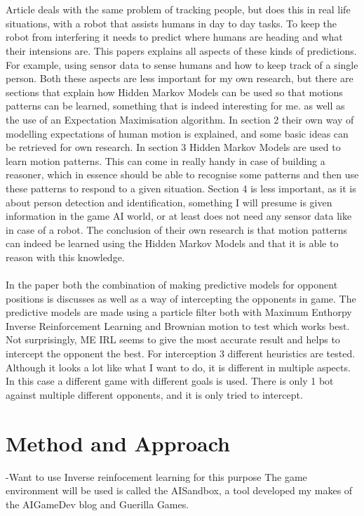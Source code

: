 \documentclass[a4paper, 12pt]{article}
\begin{document}
\\\\
Article \citep{Bennewitz05learningmotion} deals with the same problem of tracking people, but does this in real life situations, with a robot that assists humans in day to day tasks. To keep the robot from interfering it needs to predict where humans are heading and what their intensions are. This papers explains all aspects of these kinds of predictions. For example, using sensor data to sense humans and how to keep track of a single person. Both these aspects are less important for my own research, but there are sections that explain how Hidden Markov Models can be used so that motions patterns can be learned, something that is indeed interesting for me. as well as the use of an Expectation Maximisation algorithm. In section 2 their own way of modelling expectations of human motion is explained, and some basic ideas can be retrieved for own research. In section 3 Hidden Markov Models are used to learn motion patterns. This can come in really handy in case of building a reasoner, which in essence should be able to recognise some patterns and then use these patterns to respond to a given situation. Section 4 is less important, as it is about person detection and identification, something I will presume is given information in the game AI world, or at least does not need any sensor data like in case of a robot.
The conclusion of their own research is that motion patterns can indeed be learned using the Hidden Markov Models and that it is able to reason with this knowledge.
\\\\
In the paper \citep{6374144} both the combination of making predictive models
for opponent positions is discusses as well as a way of intercepting the
opponents in game. The predictive models are made using a particle filter both
with Maximum Enthorpy Inverse Reinforcement Learning and Brownian motion to test
which works best. Not surprisingly, ME IRL seems to give the most accurate result and helps to intercept the opponent the best. For interception 3 different heuristics are tested. Although it looks a lot like what I want to do, it is different in multiple aspects. In this case a different game with different goals is used. There is only 1 bot against multiple different opponents, and it is only tried to intercept.

\section{Method and Approach}
-Want to use Inverse reinfocement learning for this purpose
The game environment will be used is called the AISandbox, a tool developed my
makes of the AIGameDev blog and Guerilla Games.
\end{document}
